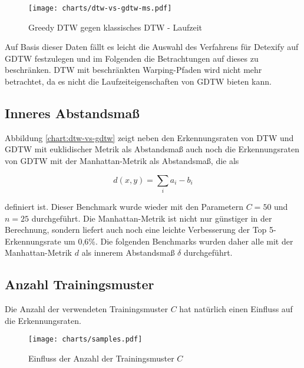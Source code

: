 \begin{figure}[htbp]
  \begin{center}
    \texttt{[image: charts/dtw-vs-gdtw-ms.pdf]}
  \end{center}
  \caption{Greedy DTW gegen klassisches DTW - Laufzeit}
  \label{chart:dtw-vs-gdtw-ms}
\end{figure}

Auf Basis dieser Daten fällt es leicht die Auswahl des Verfahrens für Detexify auf GDTW festzulegen und im Folgenden die Betrachtungen auf dieses zu beschränken. DTW mit beschränkten Warping-Pfaden wird nicht mehr betrachtet, da es nicht die Laufzeiteigenschaften von GDTW bieten kann.


\subsection{Inneres Abstandsmaß} %
\label{sub:inneres_abstandsmaß}

Abbildung \ref{chart:dtw-vs-gdtw} zeigt neben den Erkennungsraten von DTW und GDTW mit euklidischer Metrik als Abstandsmaß auch noch die Erkennungsraten von GDTW mit der Manhattan-Metrik als Abstandsmaß, die als

\[ d(x,y) = \sum_i a_i - b_i \]

definiert ist. Dieser Benchmark wurde wieder mit den Parametern $C=50$ und $n=25$ durchgeführt. Die Manhattan-Metrik ist nicht nur günstiger in der Berechnung, sondern liefert auch noch eine leichte Verbesserung der Top 5-Erkennungsrate um 0,6\%. Die folgenden Benchmarks wurden daher alle mit der Manhattan-Metrik $d$ als innerem Abstandsmaß $\delta$ durchgeführt.

\subsection{Anzahl Trainingsmuster} %
\label{sub:anzahl_trainingsmuster}

Die Anzahl der verwendeten Trainingsmuster $C$ hat natürlich einen Einfluss auf die Erkennungsraten.

\begin{figure}[htbp]
  \begin{center}
    \texttt{[image: charts/samples.pdf]}
  \end{center}
  \caption{Einfluss der Anzahl der Trainingsmuster $C$}
  \label{chart:samples}
\end{figure}

